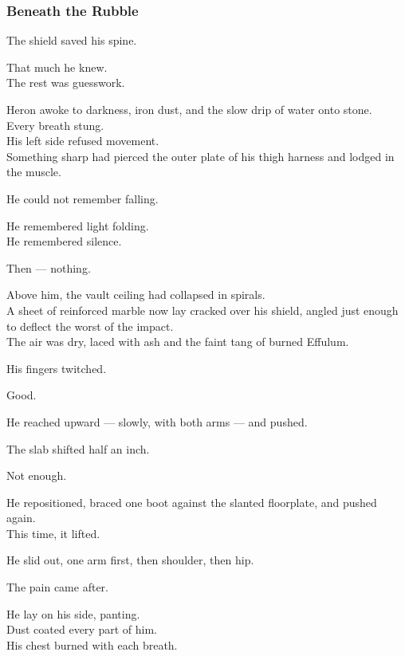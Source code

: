 \documentclass[12pt]{article}
\begin{document}
\subsubsection*{Beneath the Rubble}

The shield saved his spine.

That much he knew.\\
The rest was guesswork.

Heron awoke to darkness, iron dust, and the slow drip of water onto stone.\\
Every breath stung.\\
His left side refused movement.\\
Something sharp had pierced the outer plate of his thigh harness and lodged in the muscle.

He could not remember falling.

He remembered light folding.\\
He remembered silence.

Then — nothing.

\vspace{1em}

Above him, the vault ceiling had collapsed in spirals.\\
A sheet of reinforced marble now lay cracked over his shield, angled just enough to deflect the worst of the impact.\\
The air was dry, laced with ash and the faint tang of burned Effulum.

His fingers twitched.

Good.

He reached upward — slowly, with both arms — and pushed.

The slab shifted half an inch.

Not enough.

\vspace{1em}

He repositioned, braced one boot against the slanted floorplate, and pushed again.\\
This time, it lifted.

He slid out, one arm first, then shoulder, then hip.

The pain came after.

\vspace{1em}

He lay on his side, panting.\\
Dust coated every part of him.\\
His chest burned with each breath.
\end{document}

